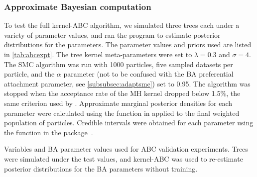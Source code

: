 \subsubsection*{Approximate Bayesian computation}

To test the full kernel-\gls{ABC} algorithm, we simulated three trees each under
a variety of parameter values, and ran the  program to
estimate posterior distributions for the parameters. The parameter values and
priors used are listed in \cref{tab:abcexpt}. The tree kernel meta-parameters
were set to $\lambda = 0.3$ and $\sigma = 4$. The \gls{SMC} algorithm was run
with 1000 particles, five sampled datasets per particle, and the $\alpha$
parameter (not to be confused with the \gls{BA} preferential attachment
parameter, see \cref{subsubsec:adaptsmc}) set to 0.95. The algorithm was
stopped when the acceptance rate of the \gls{MH} kernel dropped below 1.5\%,
the same criterion used by \citeauthor{del2012adaptive}. Approximate marginal
posterior densities for each parameter were calculated using the
 function in  applied to the final weighted
population of particles. Credible intervals were obtained for each parameter
using the  function in the 
package~\autocite{plummer2006coda}.

\begin{table}[ht]
  \centering
  
  \caption[Variables used in grid search experiments]
  {
    Variables and \gls{BA} parameter values used for \gls{ABC} validation
    experiments. Trees were simulated under the test values, and
    kernel-\gls{ABC} was used to re-estimate posterior distributions for the
    \gls{BA} parameters without training.
  }
  \label{tab:abcexpt}
\end{table}

